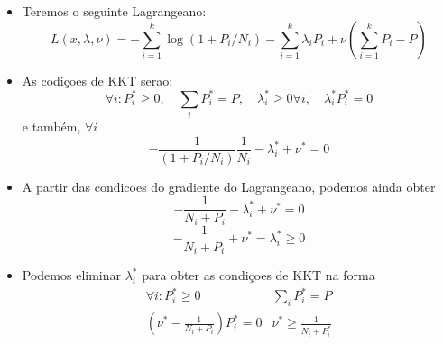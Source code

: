 \begin{frame}[allowframebreaks]
  \framebreak

  \begin{itemize}
  \item Teremos o seguinte Lagrangeano:
	\begin{equation}
	L(x,\lambda,\nu) = - \sum_{i=1}^{k} \log (1 + P_i / N_i) - \sum_{i=1}^k \lambda_i P_i + \nu \left( \sum_{i=1}^k P_i - P \right)
	\end{equation}

  \item As codiçoes de KKT serao:
	\begin{equation}
	\forall i : P_i^\ast \geq 0 , \quad \sum_i P_i^\ast = P , \quad \lambda_i^\ast \geq 0 \forall i, \quad \lambda_i^\ast P_i^\ast = 0
	\end{equation}
	e também, $\forall i$
	\begin{equation}
	- \frac{1}{(1 + P_i / N_i)} \frac{1}{N_i} - \lambda_i^\ast + \nu^\ast = 0
	\end{equation}
  \item A partir das condicoes do gradiente do Lagrangeano, podemos ainda obter
	\begin{equation}
	- \frac{1}{N_i + P_i} - \lambda_i^\ast + \nu^\ast = 0
	\end{equation}
	\begin{equation}
	- \frac{1}{N_i + P_i} + \nu^\ast = \lambda_i^\ast \geq 0
	\end{equation}
  \item Podemos eliminar $\lambda_i^\ast$ para obter as condiçoes de KKT na forma
	\begin{eqnarray}
	\forall i : P_i^\ast \geq 0  & \sum_i P_i^\ast = P \\
	\left( \nu^\ast - \frac{1}{N_i + P_i} \right) P_i^\ast = 0 & \nu^\ast \geq \frac{1}{N_i + P_i^\ast}
	\end{eqnarray}
  \end{itemize}

  \framebreak


\end{frame}
